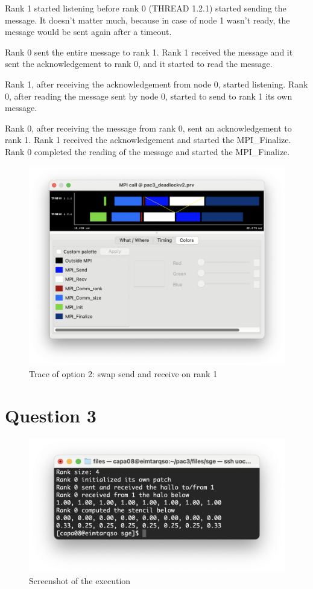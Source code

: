 \documentclass[12pt]{article}
\begin{document}
Rank 1 started listening before rank 0 (THREAD 1.2.1) started sending the message. It doesn't matter much, because in case of node 1 wasn't ready, the message would be sent again after a timeout.

Rank 0 sent the entire message to rank 1. Rank 1 received the message and it sent the acknowledgement to rank 0, and it started to read the message.

Rank 1, after receiving the acknowledgement from node 0, started listening. Rank 0, after reading the message sent by node 0, started to send to rank 1 its own message.

Rank 0, after receiving the message from rank 0, sent an acknowledgement to rank 1. Rank 1 received the acknowledgement and started the MPI\_Finalize. Rank 0 completed the reading of the message and started the MPI\_Finalize.

\begin{figure}[h!]
	\centering
	\includegraphics[width=0.8\linewidth]{images/paraver.o2.colors.png}
	\caption{Trace of option 2: swap send and receive on rank 1}
	\label{fig:swap}
\end{figure}

\newpage

\section*{Question 3}

\begin{figure}[h!]
	\centering
	\includegraphics[width=0.8\linewidth]{images/Q3.png}
	\caption{Screenshot of the execution}
	\label{fig:stencil}
\end{figure}
\end{document}
